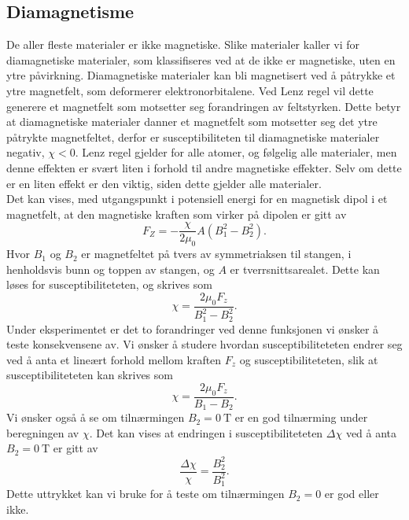 \documentclass[%
 reprint,
 amsmath,amssymb,
 aps,
 norsk,
]{revtex4-1}
\begin{document}
\subsection{Diamagnetisme}
De aller fleste materialer er ikke magnetiske. Slike materialer kaller vi for diamagnetiske materialer, som klassifiseres ved at de ikke er magnetiske, uten en ytre påvirkning. Diamagnetiske materialer kan bli magnetisert ved å påtrykke et ytre magnetfelt, som deformerer elektronorbitalene. Ved Lenz regel vil dette generere et magnetfelt som motsetter seg forandringen av feltstyrken. Dette betyr at diamagnetiske materialer danner et magnetfelt som motsetter seg det ytre påtrykte magnetfeltet, derfor er susceptibiliteten til diamagnetiske materialer negativ, $\chi < 0$. Lenz regel gjelder for alle atomer, og følgelig alle materialer, men denne effekten er svært liten i forhold til andre magnetiske effekter. Selv om dette er en liten effekt er den viktig, siden dette gjelder alle materialer.\\Det kan vises, med utgangspunkt i potensiell energi for en magnetisk dipol i et magnetfelt, at den magnetiske kraften som virker på dipolen er gitt av
\begin{equation}
  F_Z = -\frac{\chi}{2\mu_0}A\left(B_1^2 - B_2^2\right). \label{vismut}
\end{equation}
Hvor $B_1$ og $B_2$ er magnetfeltet på tvers av symmetriaksen til stangen, i henholdsvis bunn og toppen av stangen, og $A$ er tverrsnittsarealet. Dette kan løses for susceptibiliteteten, og skrives som
\begin{equation}
  \chi = \frac{2\mu_0F_z}{B_1^2 - B_2^2}.
\end{equation}
Under eksperimentet er det to forandringer ved denne funksjonen vi ønsker å teste konsekvensene av. Vi ønsker å studere hvordan susceptibiliteteten endrer seg ved å anta et lineært forhold mellom kraften $F_z$ og susceptibiliteteten, slik at susceptibiliteteten kan skrives som
\begin{equation}
  \chi = \frac{2\mu_0F_z}{B_1 - B_2}.\label{lin_chi}
\end{equation}
Vi ønsker også å se om tilnærmingen $B_2=\SI{0}{\tesla}$ er en god tilnærming under beregningen av $\chi$. Det kan vises at endringen i susceptibiliteteten $\Delta \chi$ ved å anta $B_2=\SI{0}{\tesla}$ er gitt av
\begin{equation}
  \frac{\Delta \chi}{\chi} = \frac{B_2^2}{B_1^2}. \label{test_chi}
\end{equation}
Dette uttrykket kan vi bruke for å teste om tilnærmingen $B_2=0$ er god eller ikke.
\end{document}
